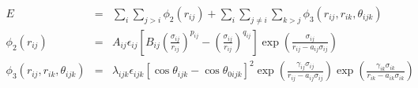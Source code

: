 \documentclass[12pt]{article}
\begin{document}
\begin{eqnarray*}
  E & = & \sum_i \sum_{j > i} \phi_2 (r_{ij}) + 
          \sum_i \sum_{j \neq i} \sum_{k > j} 
          \phi_3 (r_{ij}, r_{ik}, \theta_{ijk}) \\
  \phi_2(r_{ij}) & = & A_{ij} \epsilon_{ij} \left[ B_{ij} (\frac{\sigma_{ij}}{r_{ij}})^{p_{ij}} - 
                    (\frac{\sigma_{ij}}{r_{ij}})^{q_{ij}} \right] 
                    \exp \left( \frac{\sigma_{ij}}{r_{ij} - a_{ij} \sigma_{ij}} \right) \\
  \phi_3(r_{ij},r_{ik},\theta_{ijk}) & = & \lambda_{ijk} \epsilon_{ijk} \left[ \cos \theta_{ijk} - 
                    \cos \theta_{0ijk} \right]^2
                    \exp \left( \frac{\gamma_{ij} \sigma_{ij}}{r_{ij} - a_{ij} \sigma_{ij}} \right)
                    \exp \left( \frac{\gamma_{ik} \sigma_{ik}}{r_{ik} - a_{ik} \sigma_{ik}} \right)
\end{eqnarray*}                           
\end{document}
